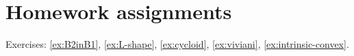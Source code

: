 \chapter{Homework assignments}

Exercises: \ref{ex:B2inB1}, \ref{ex:L-shape}, \ref{ex:cycloid}, \ref{ex:viviani}, \ref{ex:intrinsic-convex}.
